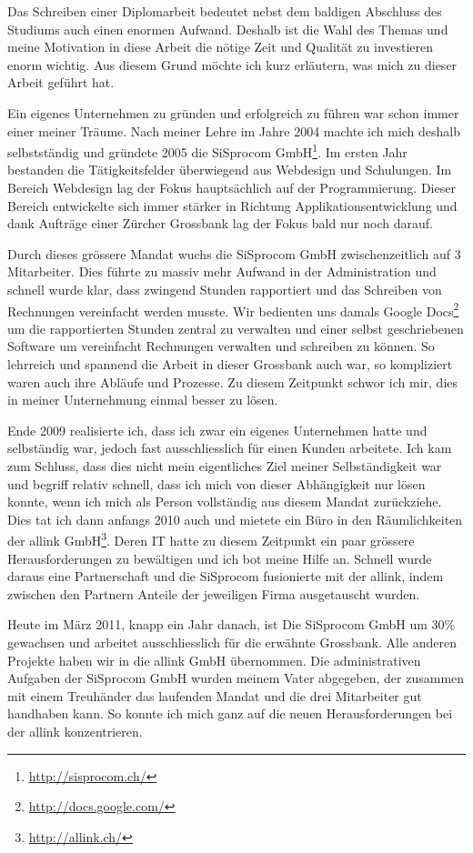 Das Schreiben einer Diplomarbeit bedeutet nebst dem baldigen Abschluss des Studiums
auch einen enormen Aufwand. Deshalb ist die Wahl des Themas und meine
Motivation in diese Arbeit die nötige Zeit und Qualität zu investieren enorm
wichtig. Aus diesem Grund möchte ich kurz erläutern, was mich zu dieser
Arbeit geführt hat.

Ein eigenes Unternehmen zu gründen und erfolgreich zu führen war schon immer
einer meiner Träume. Nach meiner Lehre im Jahre 2004 machte ich mich deshalb
selbstständig und gründete 2005 die SiSprocom GmbH\footnote{\url{http://sisprocom.ch/}}. 
Im ersten Jahr bestanden
die Tätigkeitsfelder überwiegend aus Webdesign und Schulungen. Im Bereich
Webdesign lag der Fokus hauptsächlich auf der Programmierung. Dieser Bereich 
entwickelte sich immer stärker in Richtung 
Applikationsentwicklung und dank Aufträge einer Zürcher Grossbank 
lag der Fokus bald nur noch darauf.

Durch dieses grössere Mandat wuchs die SiSprocom GmbH zwischenzeitlich
auf 3 Mitarbeiter. Dies führte zu massiv mehr Aufwand in der Administration
und schnell wurde klar, dass zwingend Stunden rapportiert und das Schreiben
von Rechnungen vereinfacht werden musste. Wir bedienten uns damals Google 
Docs\footnote{\url{http://docs.google.com/}} um die rapportierten Stunden zentral zu 
verwalten und einer selbst geschriebenen Software um vereinfacht Rechnungen 
verwalten und schreiben zu können.
So lehrreich und spannend die Arbeit in dieser Grossbank auch war, so kompliziert
waren auch ihre Abläufe und Prozesse. Zu diesem Zeitpunkt schwor ich mir, dies
in meiner Unternehmung einmal besser zu lösen.

Ende 2009 realisierte ich, dass ich zwar ein eigenes Unternehmen hatte und
selbständig war, jedoch fast ausschliesslich für einen Kunden arbeitete.
Ich kam zum Schluss, dass dies nicht mein eigentliches Ziel meiner Selbständigkeit 
war und begriff
relativ schnell, dass ich mich von dieser Abhängigkeit nur lösen konnte, wenn
ich mich als Person vollständig aus diesem Mandat zurückziehe.
Dies tat ich dann anfangs 2010 auch und mietete ein Büro in den Räumlichkeiten
der allink GmbH\footnote{\url{http://allink.ch/}}. Deren IT hatte zu diesem Zeitpunkt 
ein paar grössere
Herausforderungen zu bewältigen und ich bot meine Hilfe an. Schnell wurde
daraus eine Partnerschaft und die SiSprocom fusionierte mit der allink, indem zwischen
den Partnern Anteile der jeweiligen Firma ausgetauscht wurden.

Heute im März 2011, knapp ein Jahr danach, ist Die SiSprocom GmbH um 30\% 
gewachsen und arbeitet ausschliesslich für die erwähnte Grossbank. Alle anderen Projekte
haben wir in die allink GmbH übernommen. Die administrativen Aufgaben der
SiSprocom GmbH wurden
meinem Vater abgegeben, der zusammen mit einem Treuhänder das laufenden
Mandat und die drei Mitarbeiter gut handhaben kann. So konnte ich mich ganz
auf die neuen Herausforderungen bei der allink konzentrieren.

